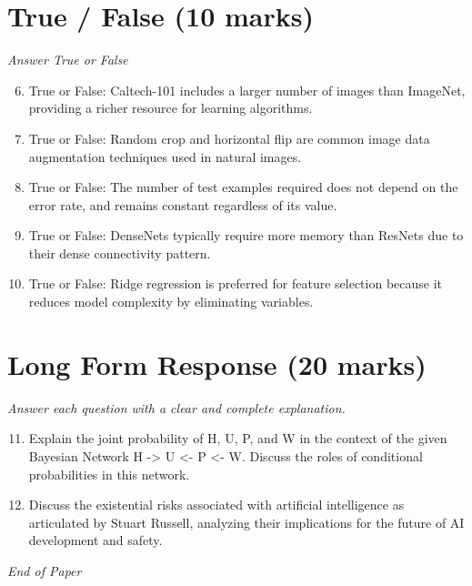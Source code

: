 \documentclass[12pt]{article}
\begin{document}
\section*{True / False (10 marks)}
\textit{Answer True or False}
\begin{enumerate}[label=\arabic*.]
\setcounter{enumi}{5}
\item True or False: Caltech-101 includes a larger number of images than ImageNet, providing a richer resource for learning algorithms.
\item True or False: Random crop and horizontal flip are common image data augmentation techniques used in natural images.
\item True or False: The number of test examples required does not depend on the error rate, and remains constant regardless of its value.
\item True or False: DenseNets typically require more memory than ResNets due to their dense connectivity pattern.
\item True or False: Ridge regression is preferred for feature selection because it reduces model complexity by eliminating variables.
\end{enumerate}

\section*{Long Form Response (20 marks)}
\textit{Answer each question with a clear and complete explanation.}
\begin{enumerate}[label=\arabic*.]
\setcounter{enumi}{10}
\item Explain the joint probability of H, U, P, and W in the context of the given Bayesian Network H -\textgreater{} U \textless{}- P \textless{}- W. Discuss the roles of conditional probabilities in this network.
\item Discuss the existential risks associated with artificial intelligence as articulated by Stuart Russell, analyzing their implications for the future of AI development and safety.
\end{enumerate}

\vfill
\noindent\textit{End of Paper}
\end{document}

